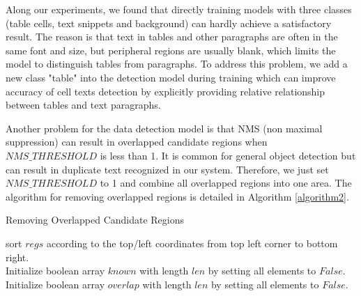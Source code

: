 \documentclass[sigconf]{acmart}
\begin{document}
Along our experiments, we found that directly training models with three classes (table cells, text snippets and background) can hardly achieve a satisfactory result. The reason is that text in tables and other paragraphs are often in the same font and size, but peripheral regions are usually blank, which limits the model to distinguish tables from paragraphs. To address this problem, we add a new class "table" into the detection model during training which can improve accuracy of cell texts detection by explicitly providing relative relationship between tables and text paragraphs.

Another problem for the data detection model is that NMS (non maximal suppression) can result in overlapped candidate regions when $NMS\_THRESHOLD$ is less than 1. It is common for general object detection but can result in duplicate text recognized in our system. Therefore, we just set $NMS\_THRESHOLD$ to 1 and combine all overlapped regions into one area. The algorithm for removing overlapped regions is detailed in Algorithm \ref{algorithm2}.

\begin{algorithm}[htb]
	\caption{Removing Overlapped Candidate Regions}
	\label{algorithm2}
	\raggedright
	
	sort $regs$ according to the top/left coordinates from top left corner to bottom right.\\
	Initialize boolean array $known$ with length $len$ by setting all elements to $False$.\\
	Initialize boolean array $overlap$ with length $len$ by setting all elements to $False$.\\
	
\end{algorithm}
\end{document}
